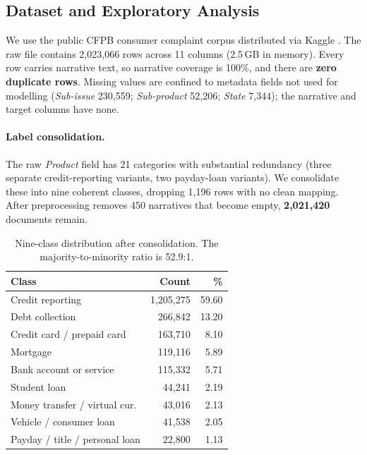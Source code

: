 \documentclass[11pt]{article}
\begin{document}
\subsection{Dataset and Exploratory Analysis}
\label{sec:data}

We use the public CFPB consumer complaint corpus distributed via Kaggle
\cite{abbasov2024kaggle,cfpb2024database}. The raw file contains 2{,}023{,}066
rows across 11 columns (2.5\,GB in memory). Every row carries narrative text, so
narrative coverage is 100\%, and there are \textbf{zero duplicate rows}. Missing
values are confined to metadata fields not used for modelling (\textit{Sub-issue}
230{,}559; \textit{Sub-product} 52{,}206; \textit{State} 7{,}344); the narrative
and target columns have none.

\paragraph{Label consolidation.}
The raw \textit{Product} field has 21 categories with substantial redundancy
(three separate credit-reporting variants, two payday-loan variants). We
consolidate these into nine coherent classes, dropping 1{,}196 rows with no
clean mapping. After preprocessing removes 450 narratives that become empty,
\textbf{2{,}021{,}420} documents remain.

\begin{table}[t]
\centering
\small
\begin{tabular}{lrr}
\toprule
\textbf{Class} & \textbf{Count} & \textbf{\%} \\
\midrule
Credit reporting            & 1{,}205{,}275 & 59.60 \\
Debt collection             &   266{,}842 & 13.20 \\
Credit card / prepaid card  &   163{,}710 &  8.10 \\
Mortgage                    &   119{,}116 &  5.89 \\
Bank account or service     &   115{,}332 &  5.71 \\
Student loan                &    44{,}241 &  2.19 \\
Money transfer / virtual cur.&   43{,}016 &  2.13 \\
Vehicle / consumer loan     &    41{,}538 &  2.05 \\
Payday / title / personal loan &  22{,}800 &  1.13 \\
\bottomrule
\end{tabular}
\caption{Nine-class distribution after consolidation. The
majority-to-minority ratio is 52.9:1.}
\label{tab:classdist}
\end{table}
\end{document}
